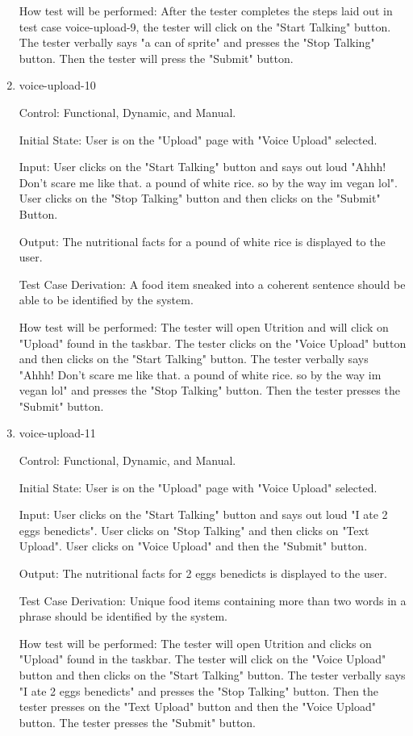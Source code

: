 \documentclass[12pt, titlepage]{article}
\begin{document}
\begin{enumerate}
	How test will be performed: After the tester completes the steps laid out in test case voice-upload-9, the tester will click on the "Start Talking" button. The tester verbally says "a can of sprite" and presses the "Stop Talking" button. Then the tester will press the "Submit" button.
	
	\item{voice-upload-10\\}
	
	Control: Functional, Dynamic, and Manual.
	
	Initial State: User is on the "Upload" page with "Voice Upload" selected.
	
	Input: User clicks on the "Start Talking" button and says out loud "Ahhh! Don't scare me like that. a pound of white rice. so by the way im vegan lol". User clicks on the "Stop Talking" button and then clicks on the "Submit" Button.
	
	Output: The nutritional facts for a pound of white rice is displayed to the user.
	
	Test Case Derivation: A food item sneaked into a coherent sentence should be able to be identified by the system. 
	
	How test will be performed: The tester will open Utrition and will click on "Upload" found in the taskbar. The tester clicks on the "Voice Upload" button and then clicks on the "Start Talking" button. The tester verbally says "Ahhh! Don't scare me like that. a pound of white rice. so by the way im vegan lol" and presses the "Stop Talking" button. Then the tester presses the "Submit" button.
	
	\item{voice-upload-11\\}
	
	Control: Functional, Dynamic, and Manual.
	
	Initial State: User is on the "Upload" page with "Voice Upload" selected.
	
	Input: User clicks on the "Start Talking" button and says out loud "I ate 2 eggs benedicts". User clicks on "Stop Talking" and then clicks on "Text Upload". User clicks on "Voice Upload" and then the "Submit" button.
	
	Output: The nutritional facts for 2 eggs benedicts is displayed to the user.
	
	Test Case Derivation: Unique food items containing more than two words in a phrase should be identified by the system.
	
	How test will be performed: The tester will open Utrition and clicks on "Upload" found in the taskbar. The tester will click on the "Voice Upload" button and then clicks on the "Start Talking" button. The tester verbally says "I ate 2 eggs benedicts" and presses the "Stop Talking" button. Then the tester presses on the "Text Upload" button and then the "Voice Upload" button. The tester presses the "Submit" button.
	

\end{enumerate}
\end{document}
